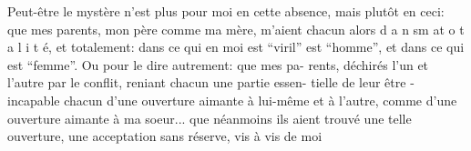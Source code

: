 Peut-être le mystère n'est plus pour moi en cette absence, mais plutôt en \unsure{;}
ceci: que mes parents, mon père comme ma mère, m'aient chacun alors 
d a n s\quad m a\quad t o t a l i t é\quad, et totalement: dans ce qui en moi est ``viril''
est ``homme'', et dans ce qui est ``femme''. Ou pour le dire autrement: que mes pa-\newline
rents, déchirés l'un et l'autre par le conflit, reniant chacun une partie essen-\newline
tielle de leur être - incapable chacun d'une ouverture aimante à lui-même et à
l'autre, comme d'une ouverture aimante à ma soeur... que néanmoins ils aient
trouvé une telle ouverture, une acceptation sans réserve, vis à vis de moi
